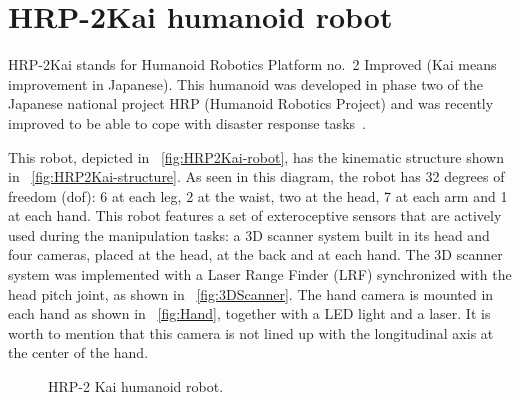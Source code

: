 \section{HRP-2Kai humanoid robot}
	\label{sec:hrp2kai}
	
	HRP-2Kai stands for Humanoid Robotics Platform no.~2 Improved (Kai means improvement in Japanese).
	This humanoid was developed in phase two of the Japanese national project HRP
	(Humanoid Robotics Project) and was recently improved to be able to cope with disaster response
	tasks~\cite{Kaneko}.
	
	This robot, depicted in \figurename~\ref{fig:HRP2Kai-robot}, has the kinematic structure shown
	in \figurename~\ref{fig:HRP2Kai-structure}.
	As seen in this diagram, the robot has 32 degrees of freedom (dof):
	6 at each leg, 2 at the waist, two at the head, 7 at each arm and 1 at each hand.
	This robot features a set of exteroceptive sensors that are actively used during the manipulation
	tasks: a 3D scanner system built in its head and four cameras, placed at the head, at the back and
	at each hand.
	The 3D scanner system was implemented with a Laser Range Finder (LRF) synchronized with the head
	pitch joint, as shown in \figurename~\ref{fig:3DScanner}.
	The hand camera is mounted in each hand as shown in \figurename~\ref{fig:Hand}, together with a
	LED light and a laser.
	It is worth to mention that this camera is not lined up with the longitudinal axis at the center
	of the hand.
	
	\begin{figure}[t]
		\begin{center}
			\hspace{1cm}
		\end{center}
		\caption{HRP-2 Kai humanoid robot.}
		\label{fig:HRP2Kai}
	\end{figure}
	
